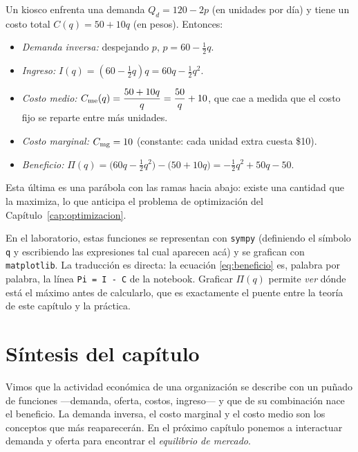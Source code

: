 \begin{ejemplo}
Un kiosco enfrenta una demanda $Q_d = 120 - 2p$ (en unidades por día) y tiene un costo total $C(q) = 50 + 10q$ (en pesos). Entonces:
\begin{itemize}
  \item \emph{Demanda inversa:} despejando $p$, \; $p = 60 - \tfrac{1}{2}q$.
  \item \emph{Ingreso:} \; $I(q) = \left(60 - \tfrac12 q\right)q = 60q - \tfrac12 q^2$.
  \item \emph{Costo medio:} \; $C_{\mathrm{me}}(q) = \dfrac{50+10q}{q} = \dfrac{50}{q} + 10$, que cae a medida que el costo fijo se reparte entre más unidades.
  \item \emph{Costo marginal:} \; $C_{\mathrm{mg}} = 10$ (constante: cada unidad extra cuesta \$10).
  \item \emph{Beneficio:} \; $\Pi(q) = \big(60q - \tfrac12 q^2\big) - \big(50 + 10q\big) = -\tfrac12 q^2 + 50q - 50.$
\end{itemize}
Esta última es una parábola con las ramas hacia abajo: existe una cantidad que la maximiza, lo que anticipa el problema de optimización del Capítulo~\ref{cap:optimizacion}.
\end{ejemplo}

\begin{labbox}
En el laboratorio, estas funciones se representan con \texttt{sympy} (definiendo el símbolo \texttt{q} y escribiendo las expresiones tal cual aparecen acá) y se grafican con \texttt{matplotlib}. La traducción es directa: la ecuación \eqref{eq:beneficio} es, palabra por palabra, la línea \texttt{Pi = I - C} de la notebook. Graficar $\Pi(q)$ permite \emph{ver} dónde está el máximo antes de calcularlo, que es exactamente el puente entre la teoría de este capítulo y la práctica.
\end{labbox}

\section{Síntesis del capítulo}

Vimos que la actividad económica de una organización se describe con un puñado de funciones —demanda, oferta, costos, ingreso— y que de su combinación nace el beneficio. La demanda inversa, el costo marginal y el costo medio son los conceptos que más reaparecerán. En el próximo capítulo ponemos a interactuar demanda y oferta para encontrar el \emph{equilibrio de mercado}.
